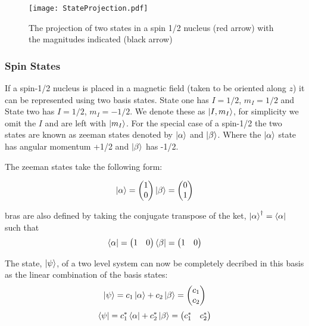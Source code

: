 \begin{figure}
  \begin{center}
  \texttt{[image: StateProjection.pdf]}
  \end{center}
  \caption{The projection of two states in a spin 1/2 nucleus (red arrow) with the magnitudes indicated (black arrow)}
  \label{fig:Projection}
\end{figure}

\subsubsection{Spin States}\label{SpinStates}

If a spin-1/2 nucleus is placed in a magnetic field (taken to be oriented along $z$) it can be represented using two basis states.
State one has $I = 1/2$, $m_I = 1/2$ and State two has $I = 1/2$, $m_I = -1/2$. We denote these as $\ket{I,m_I}$\citep{dirac_1939}, for simplicity we omit the $I$ and are left with
$\ket{m_I}$. For the special case of a spin-1/2 the two states are known as zeeman states denoted by $\ket{\alpha}$ and $\ket{\beta}$. Where the $\ket{\alpha}$ state has angular momentum +1/2 and $\ket{\beta}$ has -1/2.

The zeeman states take the following form:

\begin{equation}
  \ket{\alpha} = \begin{pmatrix}
    1\\
    0
\end{pmatrix}
 \ket{\beta} = \begin{pmatrix}
   0\\
   1
\end{pmatrix}
\end{equation}

bras are also defined by taking the conjugate transpose of the ket, $\ket{\alpha}^{\dagger} =
\bra{\alpha}$ such that
\begin{equation}
  \bra{\alpha} = \begin{pmatrix}
    1 & 0
\end{pmatrix}
  \bra{\beta} = \begin{pmatrix}
  1 & 0
\end{pmatrix}
\end{equation}

The state, $\ket{\psi}$, of a two level system can now be completely decribed in this basis
as the linear combination of the basis states:
\begin{equation}\label{eqn:zeeman}
  \ket{\psi} = c_1\ket{\alpha} + c_2\ket{\beta} = \begin{pmatrix}
    c_1\\
    c_2
\end{pmatrix}
\end{equation}
\begin{equation}
  \bra{\psi} = c_1^*\bra{\alpha} + c_2^*\ket{\beta} = \begin{pmatrix}
    c_1^* & c_2^*
\end{pmatrix}
\end{equation}

